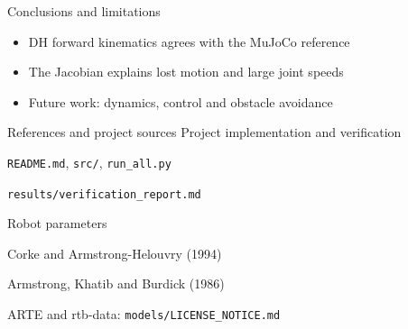 \documentclass[aspectratio=169,11pt]{beamer}
\begin{document}
\begin{frame}{Conclusions and limitations}
\begin{itemize}\setlength\itemsep{9mm}
\item DH forward kinematics agrees with the MuJoCo reference
\item The Jacobian explains lost motion and large joint speeds
\item Future work: dynamics, control and obstacle avoidance
\end{itemize}
\end{frame}

\begin{frame}{References and project sources}
\textcolor{accent}{Project implementation and verification}\par\medskip
\texttt{README.md}, \texttt{src/}, \texttt{run\_all.py}\par
\texttt{results/verification\_report.md}\par\bigskip
\textcolor{accent}{Robot parameters}\par\medskip
Corke and Armstrong-Helouvry (1994)\par\medskip
Armstrong, Khatib and Burdick (1986)\par\medskip
ARTE and rtb-data: \texttt{models/LICENSE\_NOTICE.md}
\end{frame}
\end{document}
